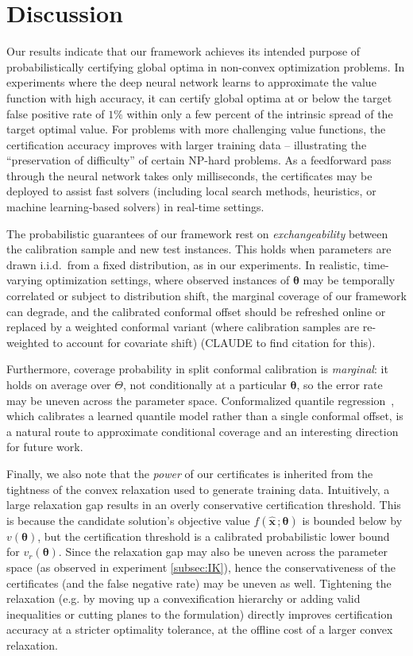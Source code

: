 \documentclass[10pt]{article} %
\theoremstyle{plain}
\theoremstyle{definition}
\theoremstyle{remark}
\begin{document}
\section{Discussion} \label{sec:discussion}

Our results indicate that our framework achieves its intended purpose of probabilistically certifying global optima in non-convex optimization problems.
In experiments where the deep neural network learns to approximate the value function with high accuracy, it can certify global optima at or below the target 
false positive rate of $1\%$ within only a few percent of the intrinsic spread of the target optimal value.
For problems with more challenging value functions, the certification accuracy improves with larger training data -- illustrating the
``preservation of difficulty'' of certain NP-hard problems.
As a feedforward pass through the neural network takes only milliseconds, the certificates may be deployed to assist fast solvers
(including local search methods, heuristics, or machine learning-based solvers) in real-time settings.

The probabilistic guarantees of our framework rest on \emph{exchangeability} between the
calibration sample and new test instances. This holds when parameters are drawn
i.i.d.\ from a fixed distribution, as in our experiments.
In realistic, time-varying optimization settings, where observed instances of $\bm{\theta}$ may be 
temporally correlated or subject to distribution shift, the marginal coverage of our framework can degrade, 
and the calibrated conformal offset should be refreshed online or replaced by a weighted conformal variant
(where calibration samples are re-weighted to account for covariate shift) (CLAUDE to find citation for this).

Furthermore, coverage probability in split conformal calibration
is \emph{marginal}: it holds on average over $\Theta$, not conditionally at a
particular $\bm{\theta}$, so the error rate may be uneven across the parameter
space. Conformalized quantile regression~\citep{romano2019conformalized}, which
calibrates a learned quantile model rather than a single conformal offset, is a
natural route to approximate conditional coverage and an interesting direction for
future work.

Finally, we also note that the \emph{power} of our certificates is inherited from the
tightness of the convex relaxation used to generate training data.
Intuitively, a large relaxation gap results in an overly conservative certification
threshold. This is because the candidate solution's
objective value $f(\hat{\mathbf{x}}\, ; \bm{\theta})$ is bounded below by $v(\bm{\theta})$,
but the certification threshold is a calibrated probabilistic lower bound for $v_r(\bm{\theta})$.
Since the relaxation gap may also be uneven across the parameter space (as observed in experiment \ref{subsec:IK}),
hence the conservativeness of the certificates (and the false negative rate) may be uneven as well.
Tightening the relaxation (e.g. by moving up a convexification
hierarchy or adding valid inequalities or cutting planes to the formulation) 
directly improves certification accuracy at a stricter optimality tolerance, at the
offline cost of a larger convex relaxation.
\end{document}
